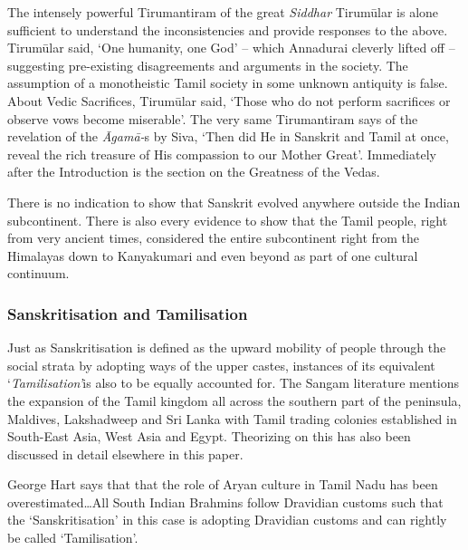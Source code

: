 The intensely powerful Tirumantiram of the great \textit{Siddhar} Tirumūlar is alone sufficient to understand the inconsistencies and provide responses to the above. Tirumūlar said, ‘One humanity, one God’ – which Annadurai cleverly lifted off – suggesting pre-existing disagreements and arguments in the society. The assumption of a monotheistic Tamil society in some unknown antiquity is false. About Vedic Sacrifices, Tirumūlar said, ‘Those who do not perform sacrifices or observe vows become miserable’. The very same Tirumantiram says of the revelation of the \textit{Āgamā-}s by Siva, ‘Then did He in Sanskrit and Tamil at once, reveal the rich treasure of His compassion to our Mother Great’. Immediately after the Introduction is the section on the Greatness of the Vedas.

There is no indication to show that Sanskrit evolved anywhere outside the Indian subcontinent. There is also every evidence to show that the Tamil people, right from very ancient times, considered the entire subcontinent right from the Himalayas down to Kanyakumari and even beyond as part of one cultural continuum.


\subsubsection*{Sanskritisation and Tamilisation}

\vskip -8pt

Just as Sanskritisation is defined as the upward mobility of people through the social strata by adopting ways of the upper castes, instances of its equivalent ‘\textit{Tamilisation’}is also to be equally accounted for. The Sangam literature mentions the expansion of the Tamil kingdom all across the southern part of the peninsula, Maldives, Lakshadweep and Sri Lanka with Tamil trading colonies established in South-East Asia, West Asia and Egypt. Theorizing on this has also been discussed in detail elsewhere in this paper.

George Hart says that that the role of Aryan culture in Tamil Nadu has been overestimated…All South Indian Brahmins follow Dravidian customs such that the ‘Sanskritisation’ in this case is adopting Dravidian customs and can rightly be called ‘Tamilisation’.


